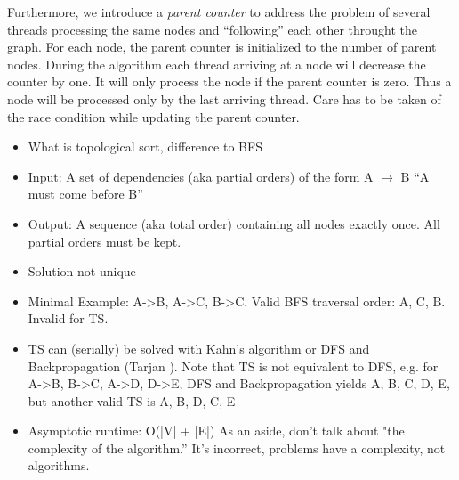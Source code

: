 Furthermore, we introduce a \emph{parent counter} to address the problem of several threads processing the same nodes and ``following'' each other throught the graph. For each node, the parent counter is initialized to the number of parent nodes. During the algorithm each thread arriving at a node will decrease the counter by one. It will only process the node if the parent counter is zero. Thus a node will be processed only by the last arriving thread. Care has to be taken of the race condition while updating the parent counter.



 
 
 
 \begin{invisible}
 \begin{itemize}
  \item What is topological sort, difference to BFS
  \item Input: A set of dependencies (aka partial orders) of the form A $\rightarrow$ B ``A must come before B''
  \item Output: A sequence (aka total order) containing all nodes exactly once. All partial orders must be kept.
  \item Solution not unique
  \item Minimal Example: A->B, A->C, B->C. Valid BFS traversal order: A, C, B. Invalid for TS.
  \item TS can (serially) be solved with Kahn's algorithm \cite{kahn1962topological} or DFS and Backpropagation (Tarjan \cite{tarjan1976edge}). %
        Note that TS is not equivalent to DFS, e.g. for A->B, B->C, A->D, D->E, DFS and Backpropagation yields A, B, C, D, E, but another valid TS is A, B, D, C, E
  \item Asymptotic runtime: O(|V| + |E|)
As an aside, don't talk about "the complexity of the algorithm.'' It's incorrect,
problems have a complexity, not algorithms.  
 \end{itemize}


\end{invisible}
